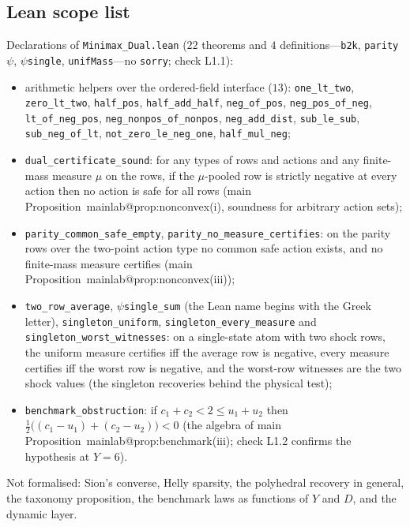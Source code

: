 \documentclass[11pt,a4paper]{article}
\makeatletter
\theoremstyle{plain}
\theoremstyle{definition}
\theoremstyle{remark}
\newcommand{\tfr}[2]{\tfrac{#1}{#2}}
\newcommand{\mref}[1]{\csname mainlab@#1\endcsname}
\makeatother
\begin{document}
\subsection{Lean scope list}
Declarations of \texttt{Minimax\_Dual.lean} ($22$ theorems and $4$ definitions---\texttt{b2k}, \texttt{parity}$\psi$, $\psi$\texttt{single}, \texttt{unifMass}---no \texttt{sorry}; check L1.1):
\begin{itemize}[leftmargin=1.4em,itemsep=0pt]\sloppy
\item arithmetic helpers over the ordered-field interface ($13$): \texttt{one\_lt\_two}, \texttt{zero\_lt\_two}, \texttt{half\_pos}, \texttt{half\_add\_half}, \texttt{neg\_of\_pos}, \texttt{neg\_pos\_of\_neg}, \texttt{lt\_of\_neg\_pos}, \texttt{neg\_nonpos\_of\_nonpos}, \texttt{neg\_add\_dist}, \texttt{sub\_le\_sub}, \texttt{sub\_neg\_of\_lt}, \texttt{not\_zero\_le\_neg\_one}, \texttt{half\_mul\_neg};
\item \texttt{dual\_certificate\_sound}: for any types of rows and actions and any finite-mass measure $\mu$ on the rows, if the $\mu$-pooled row is strictly negative at every action then no action is safe for all rows (main Proposition~\mref{prop:nonconvex}(i), soundness for arbitrary action sets);
\item \texttt{parity\_common\_safe\_empty}, \texttt{parity\_no\_measure\_certifies}: on the parity rows over the two-point action type no common safe action exists, and no finite-mass measure certifies (main Proposition~\mref{prop:nonconvex}(iii));
\item \texttt{two\_row\_average}, $\psi$\texttt{single\_sum} (the Lean name begins with the Greek letter), \texttt{singleton\_uniform}, \texttt{singleton\_every\_measure} and \texttt{singleton\_worst\_\allowbreak witnesses}: on a single-state atom with two shock rows, the uniform measure certifies iff the average row is negative, every measure certifies iff the worst row is negative, and the worst-row witnesses are the two shock values (the singleton recoveries behind the physical test);
\item \texttt{benchmark\_obstruction}: if $c_1+c_2<2\le u_1+u_2$ then $\tfr12\bigl((c_1-u_1)+(c_2-u_2)\bigr)<0$ (the algebra of main Proposition~\mref{prop:benchmark}(iii); check L1.2 confirms the hypothesis at $Y=6$).
\end{itemize}
Not formalised: Sion's converse, Helly sparsity, the polyhedral recovery in general, the taxonomy proposition, the benchmark laws as functions of $Y$ and $D$, and the dynamic layer.
\end{document}
